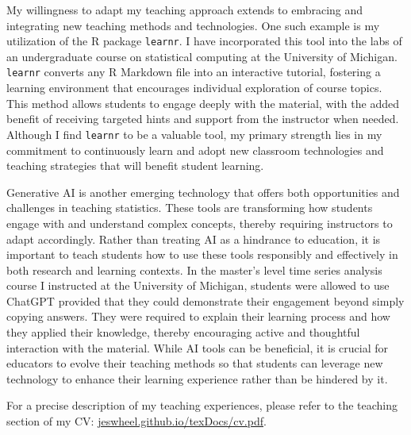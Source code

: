 \documentclass{article}
\begin{document}
My willingness to adapt my teaching approach extends to embracing and integrating new teaching methods and technologies.
One such example is my utilization of the R package \texttt{learnr}.
I have incorporated this tool into the labs of an undergraduate course on statistical computing at the University of Michigan.
\texttt{learnr} converts any R Markdown file into an interactive tutorial, fostering a learning environment that encourages individual exploration of course topics.
This method allows students to engage deeply with the material, with the added benefit of receiving targeted hints and support from the instructor when needed.
Although I find \texttt{learnr} to be a valuable tool, my primary strength lies in my commitment to continuously learn and adopt new classroom technologies and teaching strategies that will benefit student learning.

Generative AI is another emerging technology that offers both opportunities and challenges in teaching statistics.
These tools are transforming how students engage with and understand complex concepts, thereby requiring instructors to adapt accordingly.
Rather than treating AI as a hindrance to education, it is important to teach students how to use these tools responsibly and effectively in both research and learning contexts.
In the master's level time series analysis course I instructed at the University of Michigan, students were allowed to use ChatGPT provided that they could demonstrate their engagement beyond simply copying answers.
They were required to explain their learning process and how they applied their knowledge, thereby encouraging active and thoughtful interaction with the material.
While AI tools can be beneficial, it is crucial for educators to evolve their teaching methods so that students can leverage new technology to enhance their learning experience rather than be hindered by it.

For a precise description of my teaching experiences, please refer to the teaching section of my CV: \href{https://jeswheel.github.io/texDocs/cv.pdf}{jeswheel.github.io/texDocs/cv.pdf}.



\end{document}
